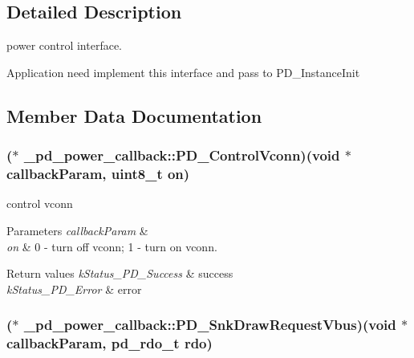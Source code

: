 \subsection{Detailed Description}
power control interface. 

Application need implement this interface and pass to P\-D\-\_\-\-Instance\-Init 

\subsection{Member Data Documentation}
\hypertarget{struct__pd__power__callback_a406d88fa8818ca8257f005c5097859e9}{
\subsubsection[{P\-D\-\_\-\-Control\-Vconn}]{($\ast$ \-\_\-pd\-\_\-power\-\_\-callback\-::\-P\-D\-\_\-\-Control\-Vconn)(void $\ast$callback\-Param, uint8\-\_\-t on)}}\label{struct__pd__power__callback_a406d88fa8818ca8257f005c5097859e9}


control vconn 


\begin{DoxyParams}{Parameters}
{\em callback\-Param} & \\
\hline
{\em on} & 0 -\/ turn off vconn; 1 -\/ turn on vconn.\\
\hline
\end{DoxyParams}

\begin{DoxyRetVals}{Return values}
{\em k\-Status\-\_\-\-P\-D\-\_\-\-Success} & success \\
\hline
{\em k\-Status\-\_\-\-P\-D\-\_\-\-Error} & error \\
\hline
\end{DoxyRetVals}
\hypertarget{struct__pd__power__callback_ac1b908d8a0b3cad5c449cde3e7b169b4}{
\subsubsection[{P\-D\-\_\-\-Snk\-Draw\-Request\-Vbus}]{($\ast$ \-\_\-pd\-\_\-power\-\_\-callback\-::\-P\-D\-\_\-\-Snk\-Draw\-Request\-Vbus)(void $\ast$callback\-Param, {\bf pd\-\_\-rdo\-\_\-t} rdo)}}\label{struct__pd__power__callback_ac1b908d8a0b3cad5c449cde3e7b169b4}


